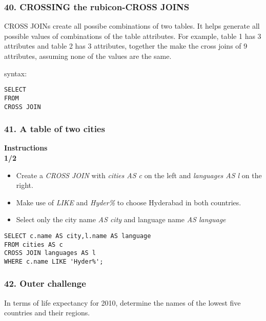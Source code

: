 \documentclass[
]{article}
\providecommand{\tightlist}{%
  \setlength{\itemsep}{0pt}\setlength{\parskip}{0pt}}
\begin{document}
\hypertarget{crossing-the-rubicon-cross-joins}{%
\subsubsection{40. CROSSING the rubicon-CROSS
JOINS}\label{crossing-the-rubicon-cross-joins}}

CROSS JOINs create all possibe combinations of two tables. It helps
generate all possible values of combinations of the table attributes.
For example, table 1 has 3 attributes and table 2 has 3 attributes,
together the make the cross joins of 9 attributes, assuming none of the
values are the same.

syntax:

\begin{verbatim}
SELECT 
FROM 
CROSS JOIN 
\end{verbatim}

\hypertarget{a-table-of-two-cities}{%
\subsubsection{41. A table of two cities}\label{a-table-of-two-cities}}

\textbf{Instructions}\\
\textbf{1/2}

\begin{itemize}
\tightlist
\item
  Create a \emph{CROSS JOIN} with \emph{cities AS c} on the left and
  \emph{languages AS l} on the right.
\item
  Make use of \emph{LIKE} and \emph{Hyder\%} to choose Hyderabad in both
  countries.
\item
  Select only the city name \emph{AS city} and language name \emph{AS
  language}
\end{itemize}

\begin{verbatim}
SELECT c.name AS city,l.name AS language
FROM cities AS c
CROSS JOIN languages AS l
WHERE c.name LIKE 'Hyder%';
\end{verbatim}

\hypertarget{outer-challenge}{%
\subsubsection{42. Outer challenge}\label{outer-challenge}}

In terms of life expectancy for 2010, determine the names of the lowest
five countries and their regions.
\end{document}
